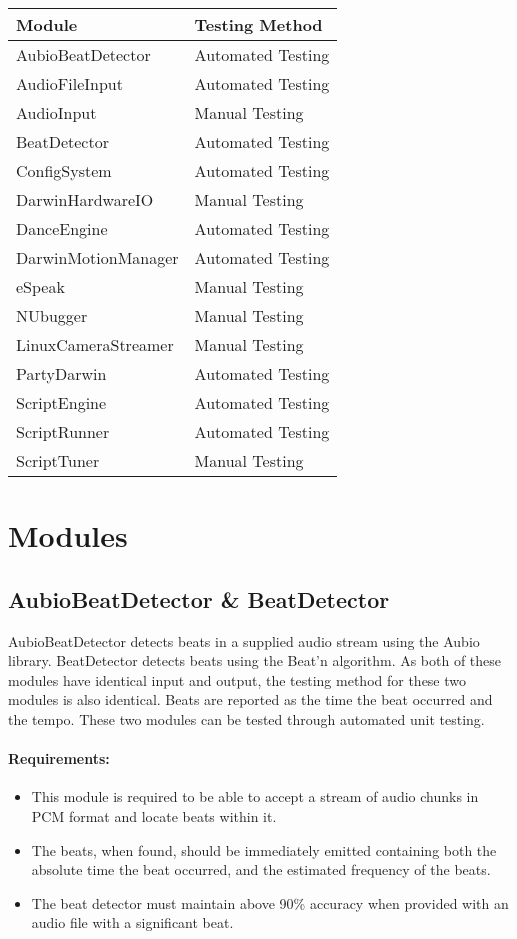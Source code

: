 \documentclass[english,12pt]{scrartcl}
\begin{document}
	\begin{tabular}{|p{7cm}|p{7cm}|}
		\hline \textbf{\large Module} & \textbf{\large Testing Method} \\ \hline
		AubioBeatDetector     & Automated Testing  \\ \hline
		AudioFileInput        & Automated Testing  \\ \hline
		AudioInput            & Manual Testing     \\ \hline
		BeatDetector          & Automated Testing  \\ \hline
		ConfigSystem          & Automated Testing  \\ \hline
		DarwinHardwareIO      & Manual Testing     \\ \hline
		DanceEngine           & Automated Testing  \\ \hline
		DarwinMotionManager   & Automated Testing  \\ \hline
		eSpeak                & Manual Testing     \\ \hline
		NUbugger              & Manual Testing     \\ \hline
		LinuxCameraStreamer   & Manual Testing     \\ \hline
		PartyDarwin           & Automated Testing  \\ \hline
		ScriptEngine          & Automated Testing  \\ \hline
		ScriptRunner          & Automated Testing  \\ \hline
		ScriptTuner           & Manual Testing     \\ \hline
	\end{tabular}

\section{Modules}
	\subsection{AubioBeatDetector \& BeatDetector}
		AubioBeatDetector detects beats in a supplied audio stream using the Aubio library.
		BeatDetector detects beats using the Beat'n algorithm.
		As both of these modules have identical input and output, the testing method for these two modules is also identical.
		Beats are reported as the time the beat occurred and the tempo.
		These two modules can be tested through automated unit testing.

		\paragraph{Requirements:}
		\begin{itemize}
			\item This module is required to be able to accept a stream of audio chunks in PCM format and locate beats within it.
			\item The beats, when found, should be immediately emitted containing both the absolute time the beat occurred, and the estimated frequency of the beats.
			\item The beat detector must maintain above 90\% accuracy when provided with an audio file with a significant beat.
		\end{itemize}
\end{document}
